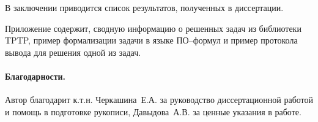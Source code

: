 В заключении приводится список результатов, полученных в диссертации. %

Приложение содержит, сводную информацию о решенных задач из библиотеки TPTP, пример формализации задачи в языке ПО--формул и пример протокола вывода для решения одной из задач.

\paragraph{Благодарности.} Автор благодарит к.т.н. Черкашина~Е.А. за руководство диссертационной работой и помощь в подготовке рукописи, Давыдова~А.В. за ценные указания в работе.


